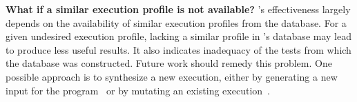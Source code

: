 \vspace{0.5mm}
\noindent \textbf{What if a similar execution profile is not available?}
\ourtool's effectiveness largely depends on the availability of
similar execution profiles from the database. For a given undesired execution profile, lacking a similar
profile in \ourtool's database may lead \ourtool to produce
less useful results.  It also indicates inadequacy of the tests from
which the database was constructed.
Future work should remedy this problem. One
possible approach is to synthesize a new execution, either by
generating a new input for the program~\cite{palus} or by mutating an
existing execution~\cite{sumnerICSE2011}.




